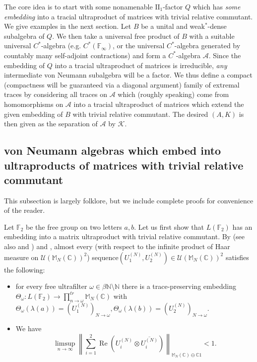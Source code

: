 \documentclass[10pt]{amsart}
\theoremstyle{definition}
\numberwithin{equation}{section}
\newcommand{\bC}{{\mathbb C}}
\newcommand{\bF}{{\mathbb F}}
\newcommand{\bM}{{\mathbb M}}
\newcommand{\bN}{{\mathbb N}}
\newcommand{\cA}{{\mathcal A}}
\newcommand{\cK}{{\mathcal K}}
\newcommand{\cU}{{\mathcal U}}
\renewcommand{\Re}{\operatorname{Re}}
\begin{document}
The core idea is to start with some nonamenable $\textrm{II}_{1}$-factor $Q$ which has \emph{some embedding} into a tracial ultraproduct of matrices with trivial relative commutant. We give examples in the next section. Let $B$ be a unital and weak$^{*}$-dense subalgebra of $Q$. We then take a universal free product of $B$ with a suitable universal $C^{*}$-algebra (e.g. $C^{*}(\bF_{\infty})$, or the universal $C^{*}$-algebra generated by countably many self-adjoint contractions) and form a $C^{*}$-algebra $\cA$. Since the embedding of $Q$ into a tracial ultraproduct of matrices is irreducible, \emph{any} intermediate von Neumann subalgebra will be a factor. We thus define a compact (compactness will be guaranteed via a diagonal argument) family of extremal traces by considering all traces on $\cA$ which (roughly speaking) come from homomorphisms on $\cA$ into a tracial ultraproduct of matrices which extend the given embedding of $B$ with trivial relative commutant. The desired $(A,K)$ is then given as the separation of $\cA$ by $\cK$. 






\subsection{von Neumann algebras which embed into ultraproducts of matrices with trivial relative commutant}\label{sec: trivial rel comm examples}

This subsection is largely folklore, but we include complete proofs for convenience of the reader.

Let $\bF_{2}$ be the free group on two letters $a,b$. Let us first show that $L(\bF_{2})$ has an embedding into a matrix ultraproduct with trivial relative commutant. 
By \cite{Hastings} (see also \cite{PisierQuantumExpander} and \cite{CollinsBordenave}) and \cite[Theorem 3.8]{VoicAsyFree}, almost every (with respect to the infinite product of Haar measure on  $\cU(\bM_{N}(\bC))^{2}$) sequence$(U_{1}^{(N)},U_{2}^{(N)})\in \cU(\bM_{N}(\bC))^{2}$ satisfies the following:
\begin{itemize}
\item for every free ultrafilter $\omega\in\beta\bN\setminus \bN$ there is a trace-preserving embedding $\Theta_{\omega}\colon L(\bF_{2})\to \prod_{n\to\omega}^{tr}\bM_{N}(\bC)$ with $\Theta_{\omega}(\lambda(a))=(U_{1}^{(N)})_{N\to\omega},\Theta_{\omega}(\lambda(b))=(U_{2}^{(N)})_{N\to\omega}.$ 
\item We have
\[\limsup_{n\to\infty}\left\|\sum_{i=1}^{2}\Re(U_{i}^{(N)}\otimes \overline{U_{i}^{(N)}})\right\|_{\bM_{N}(\bC)\ominus \bC 1}<1.\]
\end{itemize}
\end{document}
